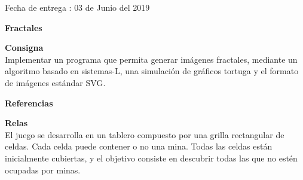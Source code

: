 \documentclass{article}
\begin{document}
\begin{titlepage}
	
	
	
	\vfill\vfill\vfill %
	{\large Fecha de entrega :} 
	{\large  03 de Junio del 2019} %
	
	
	 
	
	\vfill %
	
\end{titlepage}


\begin{Huge}
	\begin{center}
		\textbf{Fractales \\[1cm]}
	\end{center}	 
\end{Huge}




\begin{description}
	\item \textbf{Consigna} \\ Implementar un programa que permita generar im\'agenes fractales, mediante un algoritmo basado en sistemas-L, una simulaci\'on de gr\'aficos tortuga y el formato de im\'agenes est\'andar SVG. \\[0.5cm]
	\begin{center}
		\textbf{Referencias \\[1cm]}
	\end{center}	 
	 \item \textbf{Relas} \\ El juego se desarrolla en un tablero compuesto por una grilla rectangular de celdas. Cada celda puede contener o no una mina. Todas las celdas est\'an inicialmente cubiertas, y el objetivo consiste en descubrir todas las que no est\'en ocupadas por minas.\\
\end{description}
\end{document}
